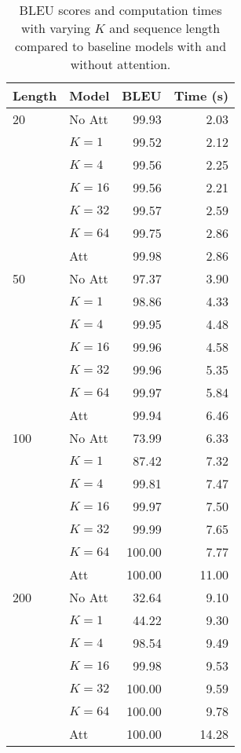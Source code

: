 \documentclass[11pt,letterpaper]{article}
\begin{document}
\begin{table}[tb]
\begin{tabular}{|l|l|r|r|}
    \hline
    \bf Length & \bf Model & \bf BLEU & \bf Time (s) \\
    \hline
     20 & No Att & 99.93 & 2.03 \\
     & $K=1$ & 99.52 & 2.12 \\
     & $K=4$ & 99.56 & 2.25 \\
     & $K=16$ & 99.56 & 2.21 \\
     & $K=32$ & 99.57 & 2.59 \\
     & $K=64$ & 99.75 & 2.86 \\
     & Att & 99.98 & 2.86 \\
     \hline
     50 & No Att & 97.37 & 3.90 \\
     & $K=1$ & 98.86 & 4.33 \\
     & $K=4$ & 99.95 & 4.48 \\
     & $K=16$ & 99.96 & 4.58 \\
     & $K=32$ & 99.96 & 5.35 \\
     & $K=64$ & 99.97& 5.84 \\
     & Att & 99.94 & 6.46 \\
    \hline
     100 & No Att & 73.99 & 6.33 \\    
     & $K=1$ & 87.42 & 7.32 \\
     & $K=4$ & 99.81 & 7.47 \\
     & $K=16$ & 99.97 & 7.50 \\
     & $K=32$ & 99.99 & 7.65 \\
     & $K=64$ & 100.00 & 7.77 \\
     & Att & 100.00 & 11.00 \\
    \hline
     200 & No Att & 32.64 & 9.10 \\
     & $K=1$ & 44.22 & 9.30 \\
     & $K=4$ & 98.54 & 9.49 \\
     & $K=16$ & 99.98 & 9.53 \\
     & $K=32$ & 100.00 & 9.59 \\
     & $K=64$ & 100.00 & 9.78 \\
     & Att & 100.00 & 14.28 \\
    \hline
\end{tabular}
\caption{BLEU scores and computation times with varying $K$ and sequence length compared to baseline models with and without attention.}
\label{table:toy_copy}
\end{table}
\end{document}
